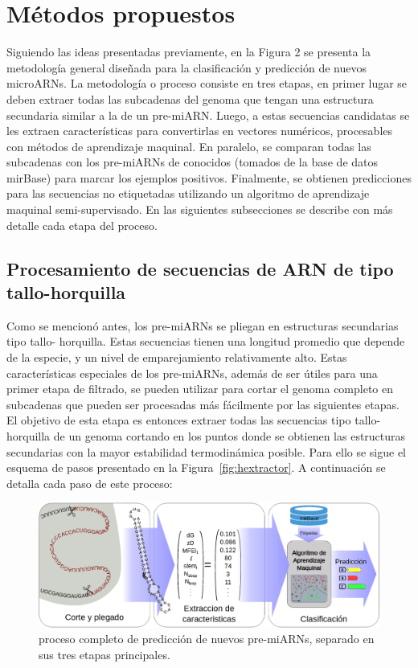 \chapter{Métodos propuestos}
Siguiendo las ideas presentadas previamente, en la Figura 2 se presenta la metodología general diseñada para la clasificación y predicción de nuevos
microARNs. La metodología o proceso consiste en tres etapas, en primer lugar se deben extraer todas las subcadenas del genoma que tengan una estructura
secundaria similar a la de un pre-miARN. Luego, a estas secuencias candidatas se les extraen características para convertirlas en vectores numéricos,
procesables con métodos de aprendizaje maquinal. En paralelo, se comparan todas las subcadenas con los pre-miARNs de conocidos (tomados de la base de datos mirBase)
para marcar los ejemplos positivos. Finalmente, se obtienen predicciones para las secuencias no etiquetadas utilizando un algoritmo de aprendizaje maquinal
semi-supervisado. En las siguientes subsecciones se describe con más detalle cada etapa del proceso.

\section{Procesamiento de secuencias de ARN de tipo tallo-horquilla}
Como se mencionó antes, los pre-miARNs se pliegan en estructuras secundarias tipo tallo- horquilla. Estas secuencias tienen una longitud promedio que depende
de la especie, y un nivel de emparejamiento relativamente alto. Estas características especiales de los pre-miARNs, además de ser útiles para una primer
etapa de filtrado, se pueden utilizar para cortar el genoma completo en subcadenas que pueden ser procesadas más fácilmente por las siguientes etapas. El
objetivo de esta etapa es entonces extraer todas las secuencias tipo tallo-horquilla de un genoma cortando en los puntos donde se obtienen las estructuras
secundarias con la mayor estabilidad termodinámica posible. Para ello se sigue el esquema de pasos presentado en la Figura~\ref{fig:hextractor}. A
continuación se detalla cada paso de este proceso:

\begin{figure}[h]
	\centering
	\includegraphics[width=\textwidth]{fig/diagrama.eps}
	\caption[Etapas de la predicción de microARN]{proceso completo de predicción de nuevos pre-miARNs, separado en sus tres etapas principales.}
	\label{fig:esquema}
\end{figure}

